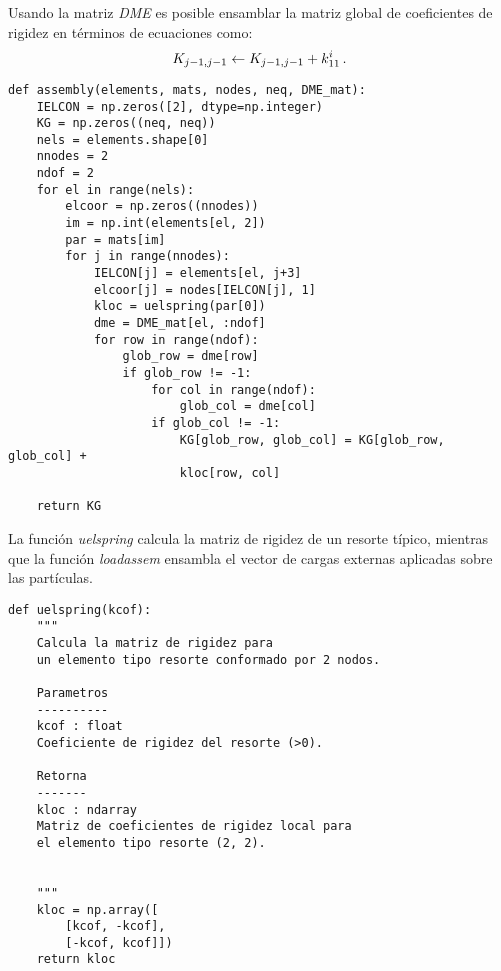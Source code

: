 Usando la matriz \textit{DME} es posible ensamblar la matriz global de 
coeficientes de rigidez en términos de ecuaciones como:
$$
K_{j - 1,j - 1} \leftarrow K_{j - 1,j - 1} + k_{11}^i\, .\\
$$

\begin{verbatim}
def assembly(elements, mats, nodes, neq, DME_mat):
    IELCON = np.zeros([2], dtype=np.integer)
    KG = np.zeros((neq, neq))
    nels = elements.shape[0]
    nnodes = 2
    ndof = 2
    for el in range(nels):
        elcoor = np.zeros((nnodes))
        im = np.int(elements[el, 2])
        par = mats[im]
        for j in range(nnodes):
            IELCON[j] = elements[el, j+3]
            elcoor[j] = nodes[IELCON[j], 1]
            kloc = uelspring(par[0])
            dme = DME_mat[el, :ndof]
            for row in range(ndof):
                glob_row = dme[row]
                if glob_row != -1:
                    for col in range(ndof):
                        glob_col = dme[col]
                    if glob_col != -1:
                        KG[glob_row, glob_col] = KG[glob_row, glob_col] + 
                        kloc[row, col]
    
    return KG
\end{verbatim}

La función \textit{uelspring} calcula la matriz de rigidez de un resorte 
típico, mientras que la función \textit{loadassem} ensambla el vector de cargas 
externas aplicadas sobre las partículas.

\begin{verbatim}
def uelspring(kcof):
    """
    Calcula la matriz de rigidez para
    un elemento tipo resorte conformado por 2 nodos.
    
    Parametros
    ----------
    kcof : float
    Coeficiente de rigidez del resorte (>0).
    
    Retorna
    -------
    kloc : ndarray
    Matriz de coeficientes de rigidez local para
    el elemento tipo resorte (2, 2).
    
    
    """
    kloc = np.array([
        [kcof, -kcof],
        [-kcof, kcof]])
    return kloc
\end{verbatim}

